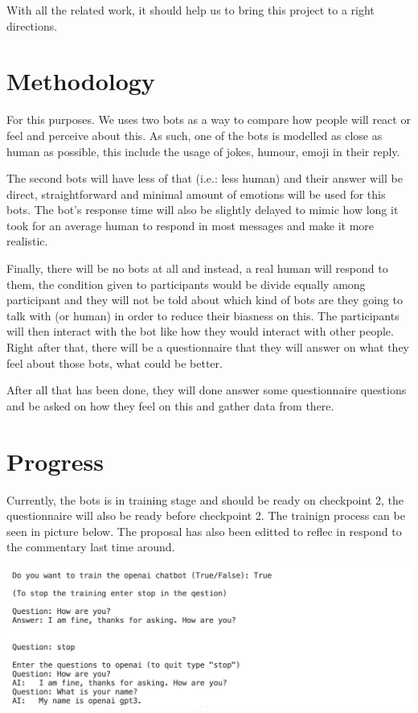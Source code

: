 \documentclass{vgtc}
\begin{document}
With all the related work, it should help us to bring this project to a
right directions.


\section{Methodology }
For this purposes. We uses two bots as a way to compare how people will react or feel and perceive  about this. As such, one of the bots is modelled as close as human as possible, this include the usage of jokes, humour, emoji in their reply. 

The second bots will have less of that (i.e.: less human) and their answer will be direct, straightforward and minimal amount of emotions will be used for this bots. The bot’s response time will also be slightly delayed to mimic how long it took for an average human to respond in most messages and make it more realistic.

Finally, there will be no bots at all and instead, a real human will respond to them, the condition given to participants would be divide equally among participant and they will not be told about which kind of bots are they going to talk with (or human) in order to reduce their biasness on this. The participants will then interact with the bot like how they would interact with other people. Right after that, there will be a questionnaire that they will answer on what they feel about those bots, what could be better.

After all that has been done, they will done answer some questionnaire questions and be asked on how they feel on this and gather data from there.


\section{Progress}

Currently, the bots is in training stage and should be ready on checkpoint 2, the questionnaire will also be ready before checkpoint 2. The trainign process can be seen in picture below. The proposal has also been editted to reflec in respond to the commentary last time around.

\includegraphics{Openai-gpt3-chatbot-output.png}




%

%
%
%


\end{document}
